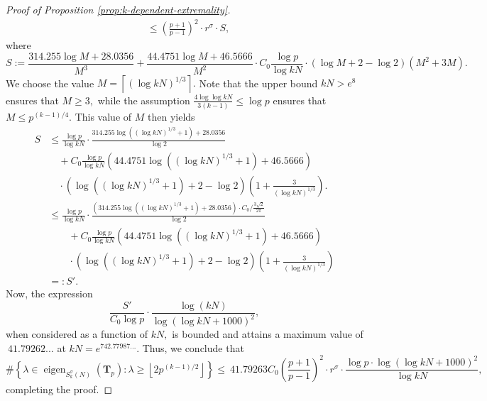 \documentclass[11pt,letterpaper,reqno]{amsart}
\theoremstyle{definition}
\numberwithin{equation}{section}
\numberwithin{figure}{section}
\numberwithin{table}{section}
\begin{document}
\begin{proof}[Proof of Proposition \ref{prop:k-dependent-extremality}]
\begin{align}
        &\leq \left( \frac{p + 1}{p - 1}\right)^2 \cdot r^\sigma \cdot S,
    \end{align}
    where 
    $$S := \frac{314.255 \log M + 28.0356}{M^3} +  \frac{44.4751 \log M + 46.5666}{M^2} \cdot C_0 \frac{\log p}{\log kN} \cdot \left( \log M + 2 - \log 2\right) \left( M^2 + 3M \right) .$$
    We choose the value $M = \left\lceil (\log kN)^{1/3} \right\rceil.$ Note that the upper bound $kN > e^8$ ensures that $M \geq 3,$ while the assumption $\frac{4 \log \log kN}{3(k - 1)} \leq \log p$ ensures that $M \leq p^{(k - 1)/4}.$ This value of $M$ then yields
    \begin{align*}
        S &\leq \frac{\log p}{\log kN} \cdot  \frac{314.255 \log \left( (\log kN)^{1/3} + 1  \right) + 28.0356}{\log 2}  \\
        & \quad + C_0 \frac{\log p}{\log kN} \left(  44.4751 \log \left( (\log kN)^{1/3} + 1  \right) + 46.5666  \right)\\ &\quad \cdot\left( \log \left( (\log kN)^{1/3} + 1  \right) + 2 - \log 2\right) \left( 1 + \frac{3}{(\log kN)^{1/3}} \right).\\
        &\leq \frac{\log p}{\log kN} \cdot  \frac{(314.255 \log \left( (\log kN)^{1/3} + 1  \right) + 28.0356) \cdot C_0/\frac{3\sqrt{2}}{2\pi}}{\log 2} \\
        & \qquad + C_0 \frac{\log p}{\log kN}\left(  44.4751 \log \left( (\log kN)^{1/3} + 1  \right) + 46.5666  \right)\\
        &\qquad \cdot \left( \log \left( (\log kN)^{1/3} + 1  \right) + 2 - \log 2\right) \left( 1 + \frac{3}{(\log kN)^{1/3}} \right) \\
        &=: S'.
    \end{align*}
    Now, the expression
    $$ \frac{S'}{C_0 \log p} \cdot \frac{\log(kN)}{\log\left( \log kN + 1000  \right)^2},$$
    when considered as a function of $kN,$ is bounded and attains a maximum value of $\ 41.79262...$ at $kN = e^{742.77987...}.$ Thus, we conclude that
    $$\#\left\{ \lambda \in \operatorname{eigen}_{ S_k^\sigma(N)} \! \left( \mathbf{T}_{p}  \right) :  \lambda  \geq \left\lfloor 2 p^{(k - 1)/2}  \right\rfloor \right\} \leq \ 41.79263 C_0 \left( \frac{p + 1}{p - 1} \right)^2 \cdot r^\sigma \cdot \frac{ \log p \cdot \log  \left(  \log kN + 1000 \right)^2}{\log kN},$$
    completing the proof.
\end{proof}
\end{document}
